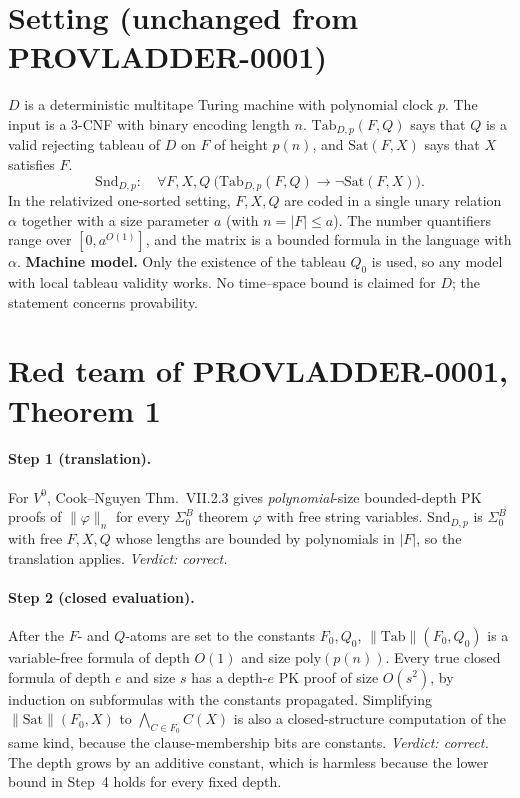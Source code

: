 \documentclass[11pt]{article}
\theoremstyle{definition}
\newcommand{\Snd}{\mathrm{Snd}}
\begin{document}
\section{Setting (unchanged from PROVLADDER-0001)}
$D$ is a deterministic multitape Turing machine with polynomial clock $p$. The input is a 3-CNF with binary encoding length $n$.
$\mathrm{Tab}_{D,p}(F,Q)$ says that $Q$ is a valid rejecting tableau of $D$ on $F$ of height $p(n)$, and $\mathrm{Sat}(F,X)$ says that $X$ satisfies $F$.
\[
\Snd_{D,p}:\quad \forall F,X,Q\ \big(\mathrm{Tab}_{D,p}(F,Q)\to\neg\mathrm{Sat}(F,X)\big).
\]
In the relativized one-sorted setting, $F,X,Q$ are coded in a single unary relation $\alpha$ together with a size parameter $a$ (with
$n=|F|\le a$). The number quantifiers range over $[0,a^{O(1)}]$, and the matrix is a bounded formula in the language with $\alpha$.
\textbf{Machine model.} Only the existence of the tableau $Q_0$ is used, so any model with local tableau validity works. No
time--space bound is claimed for $D$; the statement concerns provability.

\section{Red team of PROVLADDER-0001, Theorem 1}
\paragraph{Step 1 (translation).} For $V^0$, Cook--Nguyen Thm.~VII.2.3 gives \emph{polynomial}-size bounded-depth PK proofs of
$\|\varphi\|_n$ for every $\Sigma^B_0$ theorem $\varphi$ with free string variables. $\Snd_{D,p}$ is $\Sigma^B_0$ with free
$F,X,Q$ whose lengths are bounded by polynomials in $|F|$, so the translation applies. \emph{Verdict: correct.}
\paragraph{Step 2 (closed evaluation).} After the $F$- and $Q$-atoms are set to the constants $F_0,Q_0$,
$\|\mathrm{Tab}\|(F_0,Q_0)$ is a variable-free formula of depth $O(1)$ and size $\mathrm{poly}(p(n))$. Every true closed formula of
depth $e$ and size $s$ has a depth-$e$ PK proof of size $O(s^2)$, by induction on subformulas with the constants propagated.
Simplifying $\|\mathrm{Sat}\|(F_0,X)$ to $\bigwedge_{C\in F_0}C(X)$ is also a closed-structure computation of the same kind,
because the clause-membership bits are constants. \emph{Verdict: correct.} The depth grows by an additive constant, which is
harmless because the lower bound in Step~4 holds for every fixed depth.
\end{document}
